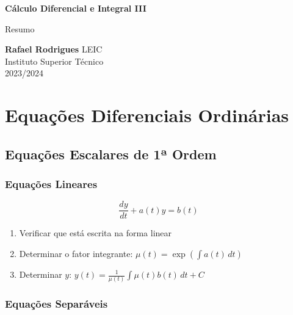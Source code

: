 \documentclass[11pt, a4paper]{article}
\begin{document}
\begin{titlepage}
    \begin{center}
        \vspace*{5cm}

        \textbf{\LARGE Cálculo Diferencial e Integral III}
        \vspace{1cm}

        \Large Resumo
        \vspace{2cm}

        \textbf{Rafael Rodrigues}
        \vfill
        LEIC \\
        Instituto Superior Técnico \\
        2023/2024
    \end{center}
\end{titlepage}

\tableofcontents

\newpage


\section{Equações Diferenciais Ordinárias}

\subsection{Equações Escalares de 1ª Ordem}

\subsubsection{Equações Lineares}

\begin{equation*}
    \frac{dy}{dt} + a(t)y = b(t)
\end{equation*}

\begin{enumerate}
    \item Verificar que está escrita na forma linear
    \item Determinar o fator integrante: $\displaystyle \mu(t) = \exp\left(\int a(t) \, dt \right)$
    \item Determinar $y$:
          $\displaystyle y(t) = \frac{1}{\mu(t)}\int \mu(t)b(t) \, dt + C$
\end{enumerate}

\subsubsection{Equações Separáveis}
\end{document}
